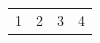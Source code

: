\documentclass[11pt]{article}
\author{root}
\date{\today}
\title{}
\begin{document}
\tableofcontents

\begin{center}
\begin{tabular}{|rr|rr|}
1 & 2 & 3 & 4\\[0pt]
\end{tabular}
\end{center}
\end{document}
